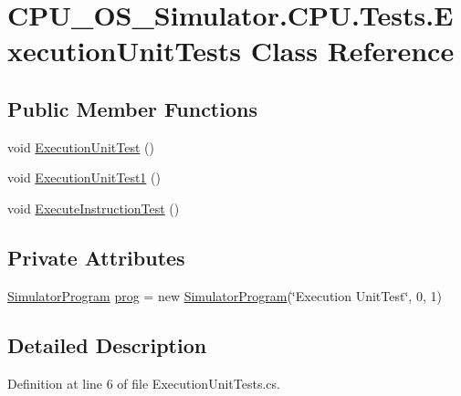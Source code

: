 \hypertarget{class_c_p_u___o_s___simulator_1_1_c_p_u_1_1_tests_1_1_execution_unit_tests}{}\section{C\+P\+U\+\_\+\+O\+S\+\_\+\+Simulator.\+C\+P\+U.\+Tests.\+Execution\+Unit\+Tests Class Reference}
\label{class_c_p_u___o_s___simulator_1_1_c_p_u_1_1_tests_1_1_execution_unit_tests}
\subsection*{Public Member Functions}
\begin{DoxyCompactItemize}
\item 
void \hyperlink{class_c_p_u___o_s___simulator_1_1_c_p_u_1_1_tests_1_1_execution_unit_tests_aaf269c98f9007b95804b7968a60824f4}{Execution\+Unit\+Test} ()
\item 
void \hyperlink{class_c_p_u___o_s___simulator_1_1_c_p_u_1_1_tests_1_1_execution_unit_tests_a1fbe0d28afb517a2d633d88189f01b68}{Execution\+Unit\+Test1} ()
\item 
void \hyperlink{class_c_p_u___o_s___simulator_1_1_c_p_u_1_1_tests_1_1_execution_unit_tests_a5316a7da14de055e3c3d06ca62832f03}{Execute\+Instruction\+Test} ()
\end{DoxyCompactItemize}
\subsection*{Private Attributes}
\begin{DoxyCompactItemize}
\item 
\hyperlink{class_c_p_u___o_s___simulator_1_1_c_p_u_1_1_simulator_program}{Simulator\+Program} \hyperlink{class_c_p_u___o_s___simulator_1_1_c_p_u_1_1_tests_1_1_execution_unit_tests_ac62f9fcd8038819097fcd0d32376c182}{prog} = new \hyperlink{class_c_p_u___o_s___simulator_1_1_c_p_u_1_1_simulator_program}{Simulator\+Program}(\char`\"{}Execution Unit\+Test\char`\"{}, 0, 1)
\end{DoxyCompactItemize}


\subsection{Detailed Description}


Definition at line 6 of file Execution\+Unit\+Tests.\+cs.



